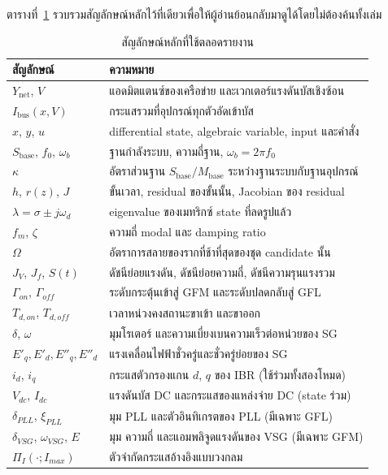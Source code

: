 \documentclass[12pt,a4paper]{article}
\newcommand{\tableheader}{\rowcolor{tablehead}}
\begin{document}
ตารางที่~\ref{tab:notation} รวบรวมสัญลักษณ์หลักไว้ที่เดียวเพื่อให้ผู้อ่านย้อนกลับมาดูได้โดยไม่ต้องค้นทั้งเล่ม
\begin{table}[H]
\centering
\caption{สัญลักษณ์หลักที่ใช้ตลอดรายงาน}
\label{tab:notation}
\begin{tabularx}{0.99\textwidth}{@{}l X@{}}
\toprule
\tableheader สัญลักษณ์ & ความหมาย \\
\midrule
$Y_{\mathrm{net}}$, $V$ & แอดมิตแตนซ์ของเครือข่าย และเวกเตอร์แรงดันบัสเชิงซ้อน \\
$I_{\mathrm{bus}}(x,V)$ & กระแสรวมที่อุปกรณ์ทุกตัวอัดเข้าบัส \\
$x$, $y$, $u$ & differential state, algebraic variable, input และคำสั่ง \\
$S_{\mathrm{base}}$, $f_0$, $\omega_b$ & ฐานกำลังระบบ, ความถี่ฐาน, $\omega_b=2\pi f_0$ \\
$\kappa$ & อัตราส่วนฐาน $S_{\mathrm{base}}/M_{\mathrm{base}}$ ระหว่างฐานระบบกับฐานอุปกรณ์ \\
$h$, $r(z)$, $J$ & ขั้นเวลา, residual ของขั้นนั้น, Jacobian ของ residual \\
$\lambda=\sigma\pm j\omega_d$ & eigenvalue ของเมทริกซ์ state ที่ลดรูปแล้ว \\
$f_m$, $\zeta$ & ความถี่ modal และ damping ratio \\
$\Omega$ & อัตราการสลายของรากที่ช้าที่สุดของชุด candidate นั้น \\
$J_V$, $J_f$, $S(t)$ & ดัชนีย่อยแรงดัน, ดัชนีย่อยความถี่, ดัชนีความรุนแรงรวม \\
$\Gamma_{on}$, $\Gamma_{off}$ & ระดับกระตุ้นเข้าสู่ GFM และระดับปลดกลับสู่ GFL \\
$T_{d,on}$, $T_{d,off}$ & เวลาหน่วงคงสถานะขาเข้า และขาออก \\
$\delta$, $\omega$ & มุมโรเตอร์ และความเบี่ยงเบนความเร็วต่อหน่วยของ SG \\
$E'_q,E'_d,E''_q,E''_d$ & แรงเคลื่อนไฟฟ้าชั่วครู่และชั่วครู่ย่อยของ SG \\
$i_d$, $i_q$ & กระแสตัวกรองแกน $d$, $q$ ของ IBR (ใช้ร่วมทั้งสองโหมด) \\
$V_{dc}$, $I_{dc}$ & แรงดันบัส DC และกระแสของแหล่งจ่าย DC (state ร่วม) \\
$\delta_{PLL}$, $\xi_{PLL}$ & มุม PLL และตัวอินทิเกรตของ PLL (มีเฉพาะ GFL) \\
$\delta_{VSG}$, $\omega_{VSG}$, $E$ & มุม ความถี่ และแอมพลิจูดแรงดันของ VSG (มีเฉพาะ GFM) \\
$\Pi_I(\cdot;I_{max})$ & ตัวจำกัดกระแสอ้างอิงแบบวงกลม \\
\bottomrule
\end{tabularx}
\end{table}
\end{document}
